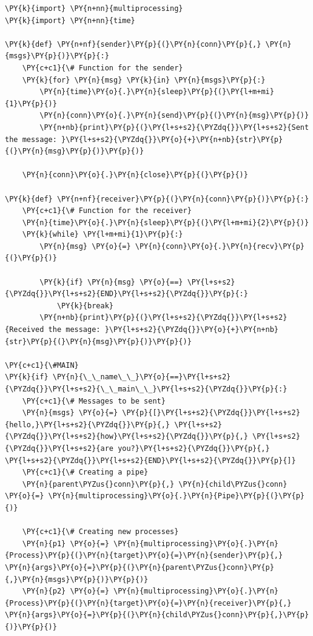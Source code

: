 \begin{Verbatim}[label=\makebox{\url{https://github.com/lucabaldini/cmepda/tree/master/slides/latex/snippets/multiprocessing_pipe.py}},commandchars=\\\{\}]
\PY{k}{import} \PY{n+nn}{multiprocessing}
\PY{k}{import} \PY{n+nn}{time}

\PY{k}{def} \PY{n+nf}{sender}\PY{p}{(}\PY{n}{conn}\PY{p}{,} \PY{n}{msgs}\PY{p}{)}\PY{p}{:}
    \PY{c+c1}{\# Function for the sender}
    \PY{k}{for} \PY{n}{msg} \PY{k}{in} \PY{n}{msgs}\PY{p}{:}
        \PY{n}{time}\PY{o}{.}\PY{n}{sleep}\PY{p}{(}\PY{l+m+mi}{1}\PY{p}{)}
        \PY{n}{conn}\PY{o}{.}\PY{n}{send}\PY{p}{(}\PY{n}{msg}\PY{p}{)}
        \PY{n+nb}{print}\PY{p}{(}\PY{l+s+s2}{\PYZdq{}}\PY{l+s+s2}{Sent the message: }\PY{l+s+s2}{\PYZdq{}}\PY{o}{+}\PY{n+nb}{str}\PY{p}{(}\PY{n}{msg}\PY{p}{)}\PY{p}{)}

    \PY{n}{conn}\PY{o}{.}\PY{n}{close}\PY{p}{(}\PY{p}{)}

\PY{k}{def} \PY{n+nf}{receiver}\PY{p}{(}\PY{n}{conn}\PY{p}{)}\PY{p}{:}
    \PY{c+c1}{\# Function for the receiver}
    \PY{n}{time}\PY{o}{.}\PY{n}{sleep}\PY{p}{(}\PY{l+m+mi}{2}\PY{p}{)}
    \PY{k}{while} \PY{l+m+mi}{1}\PY{p}{:}
        \PY{n}{msg} \PY{o}{=} \PY{n}{conn}\PY{o}{.}\PY{n}{recv}\PY{p}{(}\PY{p}{)}

        \PY{k}{if} \PY{n}{msg} \PY{o}{==} \PY{l+s+s2}{\PYZdq{}}\PY{l+s+s2}{END}\PY{l+s+s2}{\PYZdq{}}\PY{p}{:}
            \PY{k}{break}
        \PY{n+nb}{print}\PY{p}{(}\PY{l+s+s2}{\PYZdq{}}\PY{l+s+s2}{Received the message: }\PY{l+s+s2}{\PYZdq{}}\PY{o}{+}\PY{n+nb}{str}\PY{p}{(}\PY{n}{msg}\PY{p}{)}\PY{p}{)}

\PY{c+c1}{\#MAIN}
\PY{k}{if} \PY{n}{\_\_name\_\_}\PY{o}{==}\PY{l+s+s2}{\PYZdq{}}\PY{l+s+s2}{\_\_main\_\_}\PY{l+s+s2}{\PYZdq{}}\PY{p}{:}
    \PY{c+c1}{\# Messages to be sent}
    \PY{n}{msgs} \PY{o}{=} \PY{p}{[}\PY{l+s+s2}{\PYZdq{}}\PY{l+s+s2}{hello,}\PY{l+s+s2}{\PYZdq{}}\PY{p}{,} \PY{l+s+s2}{\PYZdq{}}\PY{l+s+s2}{how}\PY{l+s+s2}{\PYZdq{}}\PY{p}{,} \PY{l+s+s2}{\PYZdq{}}\PY{l+s+s2}{are you?}\PY{l+s+s2}{\PYZdq{}}\PY{p}{,} \PY{l+s+s2}{\PYZdq{}}\PY{l+s+s2}{END}\PY{l+s+s2}{\PYZdq{}}\PY{p}{]}
    \PY{c+c1}{\# Creating a pipe}
    \PY{n}{parent\PYZus{}conn}\PY{p}{,} \PY{n}{child\PYZus{}conn} \PY{o}{=} \PY{n}{multiprocessing}\PY{o}{.}\PY{n}{Pipe}\PY{p}{(}\PY{p}{)}

    \PY{c+c1}{\# Creating new processes}
    \PY{n}{p1} \PY{o}{=} \PY{n}{multiprocessing}\PY{o}{.}\PY{n}{Process}\PY{p}{(}\PY{n}{target}\PY{o}{=}\PY{n}{sender}\PY{p}{,} \PY{n}{args}\PY{o}{=}\PY{p}{(}\PY{n}{parent\PYZus{}conn}\PY{p}{,}\PY{n}{msgs}\PY{p}{)}\PY{p}{)}
    \PY{n}{p2} \PY{o}{=} \PY{n}{multiprocessing}\PY{o}{.}\PY{n}{Process}\PY{p}{(}\PY{n}{target}\PY{o}{=}\PY{n}{receiver}\PY{p}{,} \PY{n}{args}\PY{o}{=}\PY{p}{(}\PY{n}{child\PYZus{}conn}\PY{p}{,}\PY{p}{)}\PY{p}{)}


\end{Verbatim}
